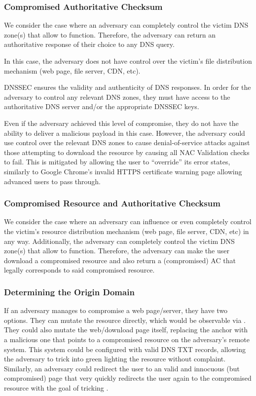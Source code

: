 \subsubsection{Compromised Authoritative Checksum}

We consider the case where an adversary can completely control the victim DNS
zone(s) that allow \SYSTEM{} to function. Therefore, the adversary can return an
authoritative response of their choice to any DNS query.

In this case, the adversary does not have control over the victim's file
distribution mechanism (web page, file server, CDN, etc).

DNSSEC ensures the validity and authenticity of DNS responses. In order for the
adversary to control any relevant DNS zones, they must have access to the
authoritative DNS server and/or the appropriate DNSSEC keys.

Even if the adversary achieved this level of compromise, they do not have the
ability to deliver a malicious payload in this case. However, the adversary
could use control over the relevant DNS zones to cause denial-of-service attacks
against those attempting to download the resource by causing all NAC Validation
checks to fail. This is mitigated by \SYSTEM{} allowing the user to ``override''
its error states, similarly to Google Chrome's invalid HTTPS certificate warning
page allowing advanced users to pass through.

\subsubsection{Compromised Resource and Authoritative Checksum}

We consider the case where an adversary can influence or even completely control
the victim's resource distribution mechanism (web page, file server, CDN, etc)
in any way. Additionally, the adversary can completely control the victim DNS
zone(s) that allow \SYSTEM{} to function. Therefore, the adversary can make the
user download a compromised resource and also return a (compromised) AC that
legally corresponds to said compromised resource.

\subsubsection{Determining the Origin Domain}

If an adversary manages to compromise a web page/server, they have two options.
They can mutate the resource directly, which would be observable via \SYSTEM{}.
They could also mutate the web/download page itself, replacing the anchor with a
malicious one that points to a compromised resource on the adversary's remote
system. This system could be configured with valid \SYSTEM{} DNS TXT records,
allowing the adversary to trick \SYSTEM{} into green lighting the resource
without complaint. Similarly, an adversary could redirect the user to an valid
and innocuous (but compromised) page that very quickly redirects the user again
to the compromised resource with the goal of tricking \SYSTEM{}.

